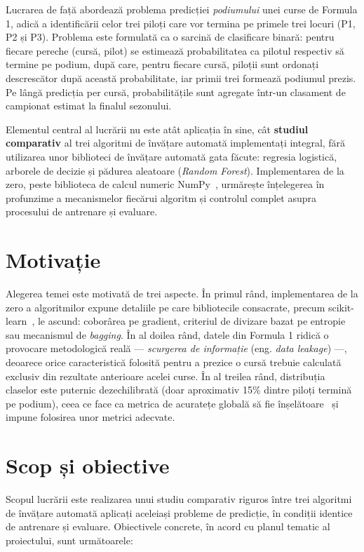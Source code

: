 \documentclass[12pt,a4paper]{report}
\begin{document}
Lucrarea de față abordează problema predicției \emph{podiumului} unei curse de Formula 1,
adică a identificării celor trei piloți care vor termina pe primele trei locuri (P1, P2 și
P3). Problema este formulată ca o sarcină de clasificare binară: pentru fiecare pereche
(cursă, pilot) se estimează probabilitatea ca pilotul respectiv să termine pe podium, după
care, pentru fiecare cursă, piloții sunt ordonați descrescător după această probabilitate,
iar primii trei formează podiumul prezis. Pe lângă predicția per cursă, probabilitățile sunt
agregate într-un clasament de campionat estimat la finalul sezonului.

Elementul central al lucrării nu este atât aplicația în sine, cât \textbf{studiul comparativ}
al trei algoritmi de învățare automată implementați integral, fără utilizarea unor
biblioteci de învățare automată gata făcute: regresia logistică, arborele de decizie și
pădurea aleatoare (\emph{Random Forest}). Implementarea de la zero, peste biblioteca de
calcul numeric NumPy~\cite{harris2020numpy}, urmărește înțelegerea în profunzime a
mecanismelor fiecărui algoritm și controlul complet asupra procesului de antrenare și
evaluare.

\section{Motivație}

Alegerea temei este motivată de trei aspecte. În primul rând, implementarea de la zero a
algoritmilor expune detaliile pe care bibliotecile consacrate, precum
scikit-learn~\cite{pedregosa2011scikit}, le ascund: coborârea pe gradient, criteriul de
divizare bazat pe entropie sau mecanismul de \emph{bagging}. În al doilea rând, datele din
Formula 1 ridică o provocare metodologică reală --- \emph{scurgerea de informație} (eng.
\emph{data leakage}) ---, deoarece orice caracteristică folosită pentru a prezice o cursă
trebuie calculată exclusiv din rezultate anterioare acelei curse. În al treilea rând,
distribuția claselor este puternic dezechilibrată (doar aproximativ 15\% dintre piloți
termină pe podium), ceea ce face ca metrica de acuratețe globală să fie
înșelătoare~\cite{he2009learning, saito2015precision} și impune folosirea unor metrici
adecvate.

\section{Scop și obiective}

Scopul lucrării este realizarea unui studiu comparativ riguros între trei algoritmi de
învățare automată aplicați aceleiași probleme de predicție, în condiții identice de
antrenare și evaluare. Obiectivele concrete, în acord cu planul tematic al proiectului,
sunt următoarele:
\end{document}
